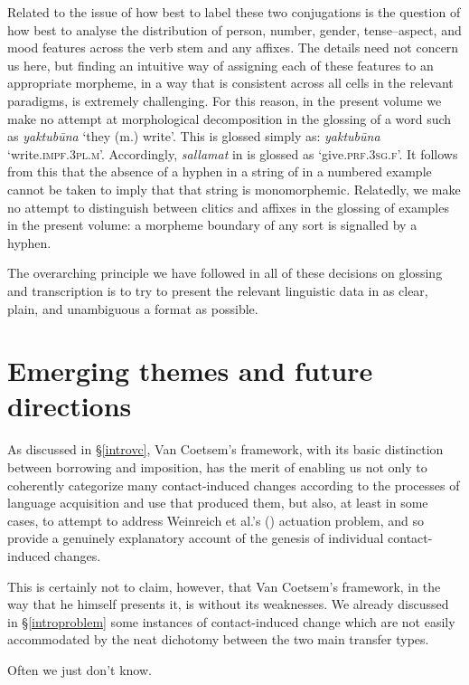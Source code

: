 \documentclass[output=paper]{langsci/langscibook}
\begin{document}
Related to the issue of how best to label these two conjugations is the question of how best to analyse the distribution of person, number, {gender}, tense--aspect, and mood features across the verb {stem} and any affixes. The details need not concern us here, but finding an intuitive way of assigning each of these features to an appropriate morpheme, in a way that is consistent across all cells in the relevant paradigms, is extremely challenging. For this reason, in the present volume we make no attempt at morphological decomposition in the glossing of a word such as  \textit{yaktubūna} `they (m.) write'. This is glossed simply as: \textit{yaktubūna} `write.\textsc{impf.3pl.m}'. Accordingly, \textit{sallamat} in  is glossed as `give.\textsc{prf.3sg.f}'. It follows from this that the absence of a hyphen in a string of  in a numbered example cannot be taken to imply that that string is monomorphemic. Relatedly, we make no attempt to distinguish between clitics and affixes in the glossing of  examples in the present volume: a morpheme boundary of any sort is signalled by a hyphen.


The overarching principle we have followed in all of these decisions on glossing and transcription is to try to present the relevant linguistic data in as clear, plain, and unambiguous a format as possible.

\section{Emerging themes and future directions}\label{introthemes}
As discussed in §\ref{introvc}, Van Coetsem's framework, with its basic distinction between borrowing and imposition, has the merit of enabling us not only to coherently categorize many contact-induced changes according to the processes of language acquisition and use that produced them, but also, at least in some cases, to attempt to address Weinreich et al.'s (\citeyear{WeinreichLabovHerzog1968}) actuation problem, and so provide a genuinely explanatory account of the genesis of individual contact-induced changes. 

This is certainly not to claim, however, that Van Coetsem's framework, in the way that he himself presents it, is without its weaknesses. We already discussed in §\ref{introproblem} some instances of contact-induced change which are not easily accommodated by the neat dichotomy between the two main transfer types.

Often we just don't know.
\end{document}

